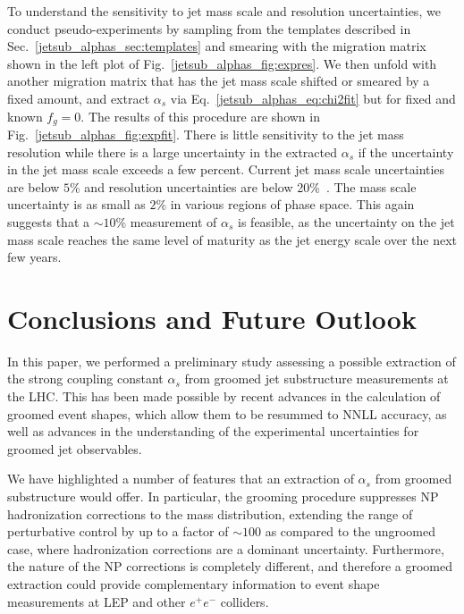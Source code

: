 \documentclass[11pt]{cernrep}
\begin{document}
To understand the sensitivity to jet mass scale and resolution uncertainties, we conduct pseudo-experiments by sampling from the templates described in Sec.~\ref{jetsub_alphas_sec:templates} and smearing with the migration matrix shown in the left plot of Fig.~\ref{jetsub_alphas_fig:expres}.
%
We then unfold with another migration matrix that has the jet mass scale shifted or smeared by a fixed amount, and extract $\alpha_s$ via Eq.~\ref{jetsub_alphas_eq:chi2fit} but for fixed and known $f_g=0$.
%
The results of this procedure are shown in Fig.~\ref{jetsub_alphas_fig:expfit}.
%
There is little sensitivity to the jet mass resolution while there is a large uncertainty in the extracted $\alpha_s$ if the uncertainty in the jet mass scale exceeds a few percent.
%
Current jet mass scale uncertainties are below $5\%$ and resolution uncertainties are below 20\%~\cite{ATLAS-CONF-2017-063,CMS-PAS-JME-16-003}.
%
The mass scale uncertainty is as small as $2\%$ in various regions of phase space.
%
This again suggests that a $\sim 10\%$ measurement of $\alpha_s$ is feasible, as the uncertainty on the jet mass scale reaches the same level of maturity as the jet energy scale over the next few years.

\section{Conclusions and Future Outlook}
\label{jetsub_alphas_sec:future}

In this paper, we performed a preliminary study assessing a possible extraction of the strong coupling constant $\alpha_s$ from groomed jet substructure measurements at the LHC.
%
This has been made possible by recent advances in the calculation of groomed event shapes, which allow them to be resummed to NNLL accuracy, as well as advances in the understanding of the experimental uncertainties for groomed jet observables.
 
We have highlighted a number of features that an extraction of $\alpha_s$ from groomed substructure would offer.
%
In particular, the grooming procedure suppresses NP hadronization corrections to the mass distribution, extending the range of perturbative control by up to a factor of $\sim 100$ as compared to the ungroomed case, where hadronization corrections are a dominant uncertainty.
%
Furthermore, the nature of the NP corrections is completely different, and therefore a groomed extraction could provide complementary information to event shape measurements at LEP and other $e^+e^-$ colliders. 
\end{document}
